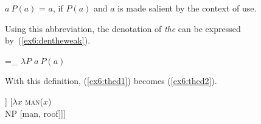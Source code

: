 %
\begin{exe}
\raggedright
	\ex \label{ex6:iotadef}
	\rotiota $a\ P(a)$ = $a$, if $P(a)$ and $a$ is made salient by the context of use.
\end{exe}
Using this abbreviation, the denotation of \emph{the} can be expressed by~(\ref{ex6:dentheweak}).
\begin{exe}
\raggedright
	\ex \label{ex6:dentheweak}
	 =_{} $\lambda P$ \rotiota $a\ P(a)$%
%
%
%
\end{exe}
With this definition, (\ref{ex6:thed1}) becomes (\ref{ex6:thed2}).
\begin{exe}
\raggedright
	\ex \label{ex6:thed2}
	\begin{forest}
		[\rotiota $a$ \textsc{man}($a$)\\DP
			[$\lambda P\ \rotiota a$ $P(a)$\\\obar{D} [the] ]
			[$\lambda x$ \textsc{man}($x)$\\ NP [man, roof]]]
		\end{forest}
\end{exe}

